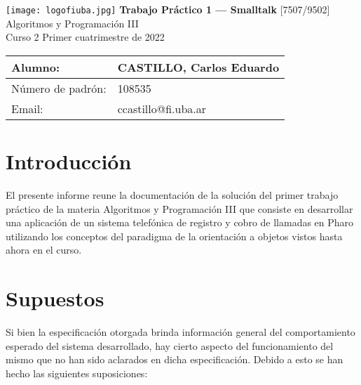 \documentclass[titlepage,a4paper]{article}
\begin{document}
\begin{titlepage} %
	\hfill\texttt{[image: logofiuba.jpg]}
    \centering
    \vfill
    \Huge \textbf{Trabajo Práctico 1 — Smalltalk}
    \vskip2cm
    \Large [7507/9502] Algoritmos y Programación III\\
    Curso 2
    Primer cuatrimestre de 2022 
    \vfill
    \begin{tabular}{ | l | l | } %
      \hline
      Alumno: & CASTILLO, Carlos Eduardo \\ \hline
      Número de padrón: & 108535 \\ \hline
      Email: & ccastillo@fi.uba.ar \\ \hline
  	\end{tabular}
    \vfill
    \vfill
\end{titlepage}

\tableofcontents %
\newpage



\section{Introducción}\label{sec:intro}
El presente informe reune la documentación de la solución del primer trabajo práctico de la materia Algoritmos y Programación III que consiste en desarrollar una aplicación de un sistema telefónica de registro y cobro de llamadas en Pharo utilizando los conceptos del paradigma de la orientación a objetos vistos hasta ahora en el curso.



\section{Supuestos}\label{sec:supuestos}

Si bien la especificación otorgada brinda información general del comportamiento esperado del sistema desarrollado, hay cierto aspecto del funcionamiento del mismo que no han sido aclarados en dicha especificación. Debido a esto se han hecho las siguientes suposiciones:
\end{document}

